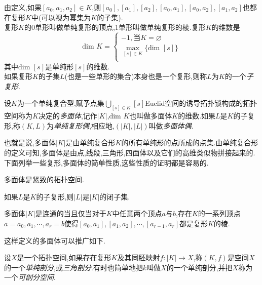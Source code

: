 \documentclass{article}
\begin{document}
由定义,如果$[a_0,a_1,a_2]\in K$,则$[a_0],[a_1],[a_2],[a_0,a_1],[a_0,a_2],[a_1,a_2]$也都在复形$K$中(可以视为幂集为$K$的子集).\\
复形$K$的0单形叫做单纯复形的顶点,1单形叫做单纯复形的棱.复形$K$的维数是
$$
\text{dim } K = \left\{
    \begin{array}{c}
        -1, \text{当}K = \varnothing\\
        \max_{[s] \in K}\{\text{dim }[s]\}\\
    \end{array}
\right.
$$
其中$\text{dim }[s]$是单纯形$[s]$的维数.\\
如果复形$K$的子集$L$(也是一些单形的集合)本身也是一个复形,则称$L$为$K$的一个\emph{子复形}.\\
\begin{definition}
    设$K$为一个单纯复合型,赋予点集$\bigcup_{[s] \in K}[s]$Euclid空间的诱导拓扑锁构成的拓扑空间称为$K$决定的\emph{多面体},记作$|K|$,$\text{dim }K$也叫做多面体$K$的维数.如果$L$是$K$的子复形,称$(K,L)$为\emph{单纯复形偶},相应地,$(|K|,|L|)$叫做\emph{多面体偶}.
\end{definition}
也就是说,多面体$|K|$是由单纯复合形$K$的所有单纯形的点所成的点集.由单纯复合形的定义可知,多面体是由点,线段,三角形,四面体以及它们的高维类似物拼接起来的.\\
下面列举一些复形,多面体的简单性质,这些性质的证明都是容易的.
\begin{property}
    多面体是紧致的拓扑空间.
\end{property}
\begin{property}
    如果$L$是$K$的子复形,则$|L|$是$|K|$的闭子集.
\end{property}
\begin{property}
    多面体$|K|$是连通的当且仅当对于$K$中任意两个顶点$a$与$b$,存在$K$的一系列顶点$a = a_0,a_1,\cdots,a_r = b$使得$[a_0,a_1],[a_1,a_2],\cdots,[a_{r-1},a_r]$都是复形$K$的棱.
\end{property}
这样定义的多面体可以推广如下.
\begin{definition}
    设$X$是一个拓扑空间,如果存在复形$K$及其同胚映射$f : |K| \to X$,称$(K,f)$是空间$X$的一个\emph{单纯剖分},或\emph{三角剖分}.有时也简单地把$k$叫做$X$的一个单纯剖分,并把$X$称为一个\emph{可剖分空间}.
\end{definition}
\end{document}
